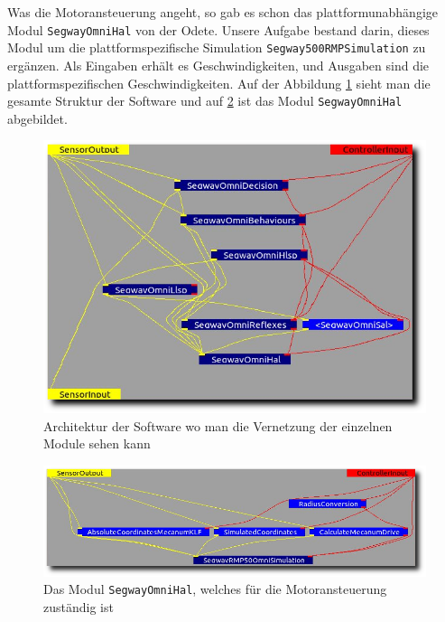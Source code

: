 Was die Motoransteuerung angeht, so gab es schon das plattformunabhängige Modul \lstinline{SegwayOmniHal} von der Odete.
Unsere Aufgabe bestand darin, dieses Modul um die plattformspezifische Simulation \lstinline{Segway500RMPSimulation} zu ergänzen.
Als Eingaben erhält es Geschwindigkeiten, und Ausgaben sind die plattformspezifischen Geschwindigkeiten.
Auf der Abbildung \ref{fig:mca2architecture} sieht man die gesamte Struktur der Software und auf \ref{fig:segwayHal} ist das Modul \lstinline{SegwayOmniHal} abgebildet.

\begin{figure}[h]
	\center
	\includegraphics[scale=0.5]{graphics/mca2architecture.png}
	\caption{\label{fig:mca2architecture} Architektur der Software wo man die Vernetzung der einzelnen Module sehen kann}
\end{figure}

\begin{figure}[h]
	\center
	\includegraphics[scale=0.5]{graphics/segwayHal.png}
	\caption{\label{fig:segwayHal} Das Modul \lstinline{SegwayOmniHal}, welches für die Motoransteuerung zuständig ist}
\end{figure}


